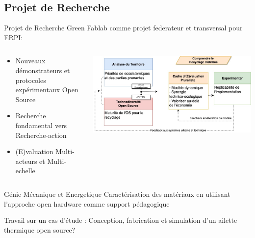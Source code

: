 \documentclass[
  11pt,
  ignorenonframetext,
  aspectratio=169,
  c]{beamer}
\begin{document}
\hypertarget{projet-de-recherche}{%
\subsection{Projet de Recherche}\label{projet-de-recherche}}

\begin{frame}{Projet de Recherche}
Green Fablab comme projet federateur et transversal pour ERPI:

\begin{columns}[T]
\begin{column}[T]{0.3\textwidth}
\footnotesize

\begin{itemize}
\item
  Nouveaux démonstrateurs et protocoles expérimentaux Open Source
\item
  Recherche fondamental vers Recherche-action
\item
  (E)valuation Multi-acteurs et Multi-echelle
\end{itemize}
\end{column}

\begin{column}[T]{0.7\textwidth}
\includegraphics{Figures/slides/Projet-Recherche.jpg}
\end{column}
\end{columns}
\end{frame}

\begin{frame}[t]{Génie Mécanique et Energetique}
\protect\hypertarget{guxe9nie-muxe9canique-et-energetique}{}
Caractérisation des matériaux en utilisant l'approche open hardware
comme support pédagogique

\begin{block}{Travail sur un cas d'étude :}
\protect\hypertarget{travail-sur-un-cas-duxe9tude}{}
Conception, fabrication et simulation d'un ailette thermique open
source?
\end{block}
\end{frame}
\end{document}
